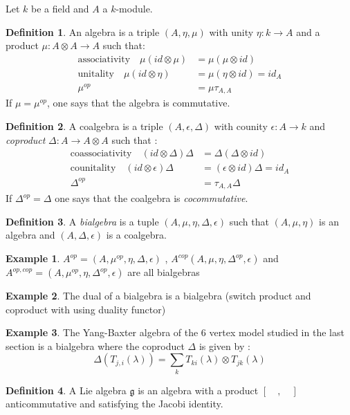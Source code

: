 \documentclass[11pt]{article}
\theoremstyle{definition}
\newtheorem{ex}{Example}[section]
\newtheorem{Def}{Definition}[section]
\begin{document}
Let $k$ be a field and $A$ a $k$-module.\begin{Def} An algebra is a triple $(A,\eta,\mu)$  with unity $\eta : k\to A$ and a product $\mu: A\otimes A\to A$ such that: 
\begin{align*} 
\mbox{associativity}\quad\mu(id\otimes\mu) & =\mu(\mu\otimes id) \\
\mbox{unitality}\quad\mu(id\otimes\eta) & =\mu(\eta\otimes id)=id_A \\
\mu^{op} & =\mu\tau_{A,A}
\end{align*} 
If $\mu=\mu^{op}$, one says that the algebra is commutative.
\end{Def}
\begin{Def} A coalgebra is a triple $(A,\epsilon,\Delta)$ with counity $\epsilon : A\to k $ and \textit{coproduct} $\Delta : A\to A\otimes A $ such that : \begin{align*} 
\mbox{coassociativity}\quad (id\otimes\Delta)\Delta & =\Delta(\Delta\otimes id) \\
\mbox{counitality}\quad (id\otimes\epsilon)\Delta & =(\epsilon\otimes id)\Delta=id_{A} \\
\Delta^{op} & =\tau_{A,A}\Delta
\end{align*}
If $\Delta^{op}=\Delta$ one says that the coalgebra is \textit{cocommutative}.
\end{Def}
\begin{Def} A \textit{bialgebra} is a tuple $(A,\mu,\eta,\Delta,\epsilon)$ such that $(A,\mu,\eta)$ is an algebra and  $(A,\Delta,\epsilon)$ is a coalgebra.
\end{Def}
\begin{ex}
$A^{op}=(A,\mu^{op},\eta,\Delta,\epsilon)$ , $A^{cop} (A,\mu,\eta,\Delta^{op},\epsilon)$ and $A^{op,cop}=(A,\mu^{op},\eta,\Delta^{op},\epsilon)$ are all bialgebras
\end{ex}
\begin{ex} The dual of a bialgebra is a bialgebra (switch product and coproduct with using duality functor)
\end{ex}
\begin{ex} The Yang-Baxter algebra of the 6 vertex model studied in the last section is a bialgebra where the coproduct $\Delta$ is given by : $$\Delta(T_{j,i}(\lambda))=\sum_{k}T_{ki}(\lambda)\otimes T_{jk}(\lambda)$$
\end{ex}
\begin{Def} A Lie algebra $\mathfrak{g}$ is an algebra with a product $[\quad,\quad]$ anticommutative and satisfying the Jacobi identity.
\end{Def}
\end{document}
